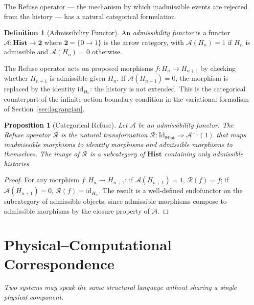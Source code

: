 \documentclass[12pt, twoside]{article}
\theoremstyle{plain}
\newtheorem{proposition}[theorem]{Proposition}
\theoremstyle{definition}
\newtheorem{definition}[theorem]{Definition}
\theoremstyle{remark}
\begin{document}
The Refuse operator — the mechanism by which inadmissible events
are rejected from the history — has a natural categorical formulation.

\begin{definition}[Admissibility Functor]
An \emph{admissibility functor} is a functor
$\mathcal{A}: \mathbf{Hist} \to \mathbf{2}$
where $\mathbf{2} = \{0 \to 1\}$ is the arrow category,
with $\mathcal{A}(H_n) = 1$ if $H_n$ is admissible and
$\mathcal{A}(H_n) = 0$ otherwise.
\end{definition}

The Refuse operator acts on proposed morphisms
$f: H_n \to H_{n+1}$ by checking whether $H_{n+1}$ is
admissible given $H_n$.
If $\mathcal{A}(H_{n+1}) = 0$, the morphism is replaced by
the identity $\mathrm{id}_{H_n}$: the history is not extended.
This is the categorical counterpart of the infinite-action
boundary condition in the variational formalism of
Section~\ref{sec:lagrangian}.

\begin{proposition}[Categorical Refuse]
\label{prop:catrefuse}
Let $\mathcal{A}$ be an admissibility functor.
The Refuse operator $\mathcal{R}$ is the natural transformation
$\mathcal{R}: \mathrm{Id}_{\mathbf{Hist}} \Rightarrow \mathcal{A}^{-1}(1)$
that maps inadmissible morphisms to identity morphisms and
admissible morphisms to themselves.
The image of $\mathcal{R}$ is a subcategory of $\mathbf{Hist}$
containing only admissible histories.
\end{proposition}

\begin{proof}
For any morphism $f: H_n \to H_{n+1}$:
if $\mathcal{A}(H_{n+1}) = 1$, $\mathcal{R}(f) = f$;
if $\mathcal{A}(H_{n+1}) = 0$, $\mathcal{R}(f) = \mathrm{id}_{H_n}$.
The result is a well-defined endofunctor on the subcategory
of admissible objects, since admissible morphisms compose to
admissible morphisms by the closure property of $\mathcal{A}$.
\end{proof}

\newpage

\section{Physical--Computational Correspondence}
\label{sec:phys-comp}

\epigraph{\itshape
  Two systems may speak the same structural language
  without sharing a single physical component.}{}
\end{document}
